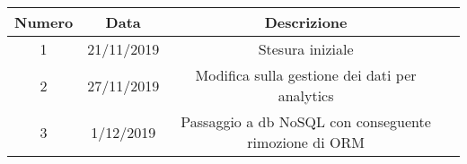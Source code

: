 \begin{tabular}{|c | c | c | c|} 
 	\hline
	 Numero & Data & Descrizione \\ [0.5ex] 
	\hline\hline
	1 & 21/11/2019 & Stesura iniziale \\ 
	\hline
	2 & 27/11/2019 & Modifica sulla gestione dei dati per analytics \\
	\hline
	3 & 1/12/2019 & Passaggio a db NoSQL con conseguente rimozione di ORM \\
	\hline
\end{tabular}